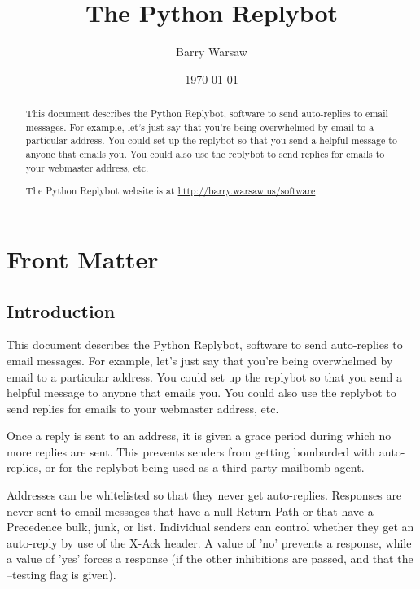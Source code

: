 \documentclass{howto}
\title{The Python Replybot}
\author{Barry Warsaw}
\date{\today}
\begin{document}
\maketitle

%
\ifhtml
\chapter*{Front Matter\label{front}}
\fi

\begin{abstract}
\noindent
This document describes the Python Replybot, software to send auto-replies to
email messages.  For example, let's just say that you're being overwhelmed by
email to a particular address.  You could set up the replybot so that you send
a helpful message to anyone that emails you.  You could also use the replybot
to send replies for emails to your webmaster address, etc.

\noindent
The Python Replybot website is at \url{http://barry.warsaw.us/software}
\end{abstract}

%
\tableofcontents

\section{Introduction}

This document describes the Python Replybot, software to send auto-replies to
email messages.  For example, let's just say that you're being overwhelmed by
email to a particular address.  You could set up the replybot so that you send
a helpful message to anyone that emails you.  You could also use the replybot
to send replies for emails to your webmaster address, etc.

Once a reply is sent to an address, it is given a grace period during which no
more replies are sent.  This prevents senders from getting bombarded with
auto-replies, or for the replybot being used as a third party mailbomb agent.

Addresses can be whitelisted so that they never get auto-replies.  Responses
are never sent to email messages that have a null Return-Path or that have a
Precedence bulk, junk, or list.  Individual senders can control whether they
get an auto-reply by use of the X-Ack header.  A value of 'no' prevents a
response, while a value of 'yes' forces a response (if the other inhibitions
are passed, and that the --testing flag is given).
\end{document}
